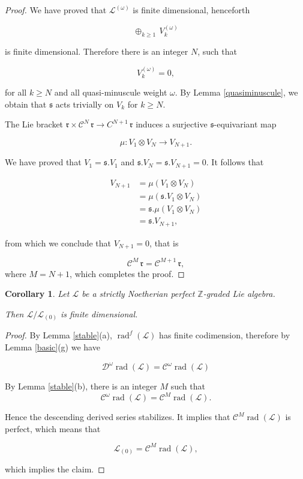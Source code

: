 \documentclass[11pt, letterpaper, reqno]{amsart}
\newtheorem{cor}[theorem]{Corollary}
\theoremstyle{definition}
\newcommand{\rad}{\operatorname{rad}}
\newcommand{\Z}{{\mathbb Z}}
\newcommand{\cC}{\mathcal C}
\newcommand{\cD}{\mathscr D}
\newcommand{\cL}{\mathcal L}
\newcommand{\fr}{\mathfrak{r}}
\newcommand{\fs}{\mathfrak{s}}
\begin{document}
\begin{proof}
We have proved that $\cL^{(\omega)}$ is finite dimensional, henceforth 

$$\oplus_{k{\geq 1}}
\,V_k^{(\omega)}$$

\noindent is finite dimensional. Therefore there
is an integer $N$, such that

$$V_k^{(\omega)}=0,$$

\noindent for all $k\geq N$ and all
quasi-minuscule weight $\omega$. By Lemma
\ref{quasiminuscule}, we obtain that
$\fs$ acts trivially on $V_k$ for $k\geq N$.

The Lie bracket
$\fr\times \cC^N\,\fr\to C^{N+1}\,\fr$
induces a surjective
$\fs$-equivariant map

$$\mu: V_1\otimes V_N
 \to V_{N+1}.$$
 
 \noindent We have proved that $V_1=\fs.V_1$
 and $\fs.V_N=\fs.V_{N+1}=0$. It follows that
 
 \begin{align*}
 V_{N+1}&=\mu(V_1\otimes V_N)\\
 &=\mu(\fs.V_1\otimes V_N)\\
 &=\fs.\mu(V_1\otimes V_N)\\
 &=\fs.V_{N+1},
 \end{align*}
 
\noindent from which  we conclude that $V_{N+1}=0$, that is
 
 $$\cC^{M}\,\fr=\cC^{M+1}\,\fr,$$
\noindent where $M=N+1$, which completes the proof.
\end{proof}


\begin{cor}\label{L/L0}
Let $\cL$ be a  strictly 
Noetherian perfect $\Z$-graded Lie algebra.

Then $\cL/\cL_{(0)}$ is finite dimensional.
\end{cor}

\begin{proof} By Lemma \ref{stable}(a),
$\rad^f(\cL)$ has finite codimension,
therefore by Lemma \ref{basic}(g) we have

$$\cD^\omega\rad(\cL)=\cC^\omega\rad(\cL)$$

By Lemma \ref{stable}(b), there is an integer $M$ 
such that
$$\cC^\omega\rad(\cL)=\cC^M\rad(\cL).$$

Hence the descending derived series stabilizes. It implies that $\cC^M\rad(\cL)$ is perfect, which means that

$$\cL_{(0)}=\cC^M\rad(\cL),$$

\noindent which implies the claim.
\end{proof}
\end{document}
